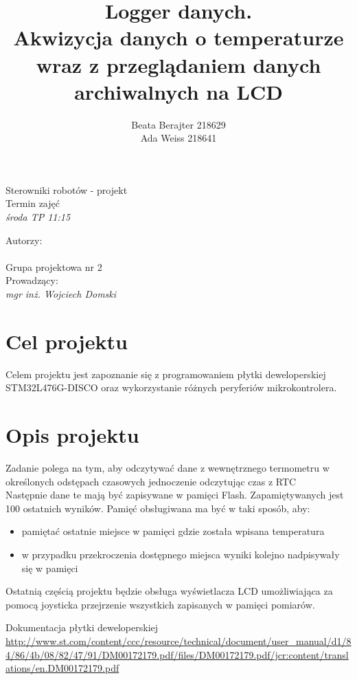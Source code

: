 \documentclass[a4paper,12pt]{article}
\author{Beata Berajter 218629\\
Ada Weiss 218641 }%
\title{Logger danych.\\Akwizycja danych o temperaturze wraz z przeglądaniem danych archiwalnych na LCD }
\makeatletter
\renewcommand{\maketitle}{\begin{titlepage}  
    \vspace*{1cm}
    \begin{center}
  Sterowniki robotów - projekt\\
Termin zajęć\\
\textit{środa TP 11:15}
    \end{center}
      \vspace{3cm}
    \begin{center}
     \LARGE \textsc {\@title}
         \end{center}
     \vspace{1cm}
    
    \begin{center}
    Autorzy:\\
   \textit{\@author} \\
\vspace{1cm}
Grupa projektowa nr 2\\
\vspace{2cm}
Prowadzący:\\
 \textit{mgr inż. Wojciech Domski}

     \end{center}
      \vspace{1cm}
    
    
    \vspace*{\stretch{6}}
    \begin{center}
    \@date
    \end{center}
  \end{titlepage}
}
\makeatother
\begin{document}
\newpage
\maketitle
\newpage
\tableofcontents

\newpage
\section{Cel projektu}
Celem projektu jest zapoznanie się z programowaniem płytki deweloperskiej STM32L476G-DISCO oraz wykorzystanie różnych peryferiów mikrokontrolera.
\section{Opis projektu}

Zadanie polega na tym, aby odczytywać dane z wewnętrznego termometru w określonych odstępach czasowych
jednoczenie odczytując czas z RTC\\
Następnie dane te mają być zapisywane w pamięci Flash. Zapamiętywanych jest 100 ostatnich wyników. Pamięć obsługiwana ma być w taki sposób, aby:
\begin{itemize}
    \item pamiętać ostatnie miejsce w pamięci gdzie została wpisana temperatura
    \item w przypadku przekroczenia dostępnego miejsca wyniki kolejno nadpisywały się w pamięci
\end{itemize}

Ostatnią częścią projektu będzie obsługa wyświetlacza LCD umożliwiająca za pomocą joysticka przejrzenie wszystkich zapisanych w pamięci pomiarów.

\begin{thebibliography}{99}
 Dokumentacja płytki deweloperskiej 
\url {http://www.st.com/content/ccc/resource/technical/document/user_manual/d1/84/86/4b/08/82/47/91/DM00172179.pdf/files/DM00172179.pdf/jcr:content/translations/en.DM00172179.pdf}

\end{thebibliography}
\end{document}
